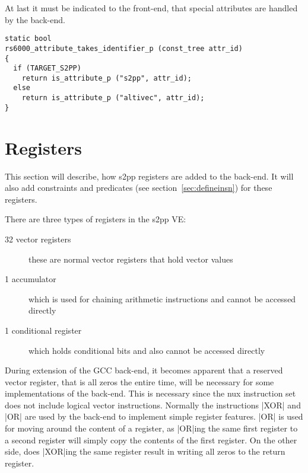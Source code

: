 At last it must be indicated to the front-end, that special attributes are handled by the back-end.
\begin{lstlisting}
static bool
rs6000_attribute_takes_identifier_p (const_tree attr_id)
{
  if (TARGET_S2PP)
    return is_attribute_p ("s2pp", attr_id);
  else
    return is_attribute_p ("altivec", attr_id);
}
\end{lstlisting}

\section{Registers}
\label{section:register}
This section will describe, how \ac{s2pp} registers are added to the back-end.
It will also add constraints and predicates (see section~\ref{sec:defineinsn}) for these registers.

There are three types of registers in the \ac{s2pp} \ac{VE}:
\begin{description}
    \item[32 vector registers] these are normal vector registers that hold vector values
    \item[1 accumulator] which is used for chaining arithmetic instructions and cannot be accessed directly
    \item[1 conditional register] which holds conditional bits and also cannot be accessed directly
\end{description}

During extension of the \ac{GCC} back-end, it becomes apparent that a reserved vector register, that is all zeros the entire time, will be necessary for some implementations of the back-end.
This is necessary since the nux instruction set does not include logical vector instructions.
Normally the instructions |XOR| and |OR| are used by the back-end to implement simple register features.
|OR| is used for moving around the content of a register, as |OR|ing the same first register to a second register will simply copy the contents of the first register.
On the other side, does |XOR|ing the same register result in writing all zeros to the return register.

